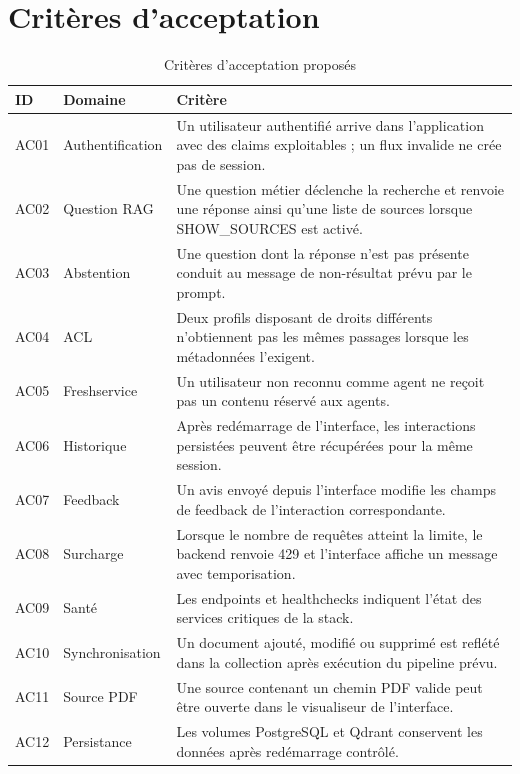 \section{Critères d'acceptation}

\begin{table}[H]
\centering
\caption{Critères d'acceptation proposés}
\label{tab:acceptance_ch4}
\begin{tabular}{p{1.2cm}p{2.6cm}p{10cm}}
\toprule
\textbf{ID} & \textbf{Domaine} & \textbf{Critère} \\
\midrule
AC01 & Authentification & Un utilisateur authentifié arrive dans l'application avec des claims exploitables ; un flux invalide ne crée pas de session. \\
AC02 & Question RAG & Une question métier déclenche la recherche et renvoie une réponse ainsi qu'une liste de sources lorsque SHOW\_SOURCES est activé. \\
AC03 & Abstention & Une question dont la réponse n'est pas présente conduit au message de non-résultat prévu par le prompt. \\
AC04 & ACL & Deux profils disposant de droits différents n'obtiennent pas les mêmes passages lorsque les métadonnées l'exigent. \\
AC05 & Freshservice & Un utilisateur non reconnu comme agent ne reçoit pas un contenu réservé aux agents. \\
AC06 & Historique & Après redémarrage de l'interface, les interactions persistées peuvent être récupérées pour la même session. \\
AC07 & Feedback & Un avis envoyé depuis l'interface modifie les champs de feedback de l'interaction correspondante. \\
AC08 & Surcharge & Lorsque le nombre de requêtes atteint la limite, le backend renvoie 429 et l'interface affiche un message avec temporisation. \\
AC09 & Santé & Les endpoints et healthchecks indiquent l'état des services critiques de la stack. \\
AC10 & Synchronisation & Un document ajouté, modifié ou supprimé est reflété dans la collection après exécution du pipeline prévu. \\
AC11 & Source PDF & Une source contenant un chemin PDF valide peut être ouverte dans le visualiseur de l'interface. \\
AC12 & Persistance & Les volumes PostgreSQL et Qdrant conservent les données après redémarrage contrôlé. \\
\bottomrule
\end{tabular}
\end{table}

